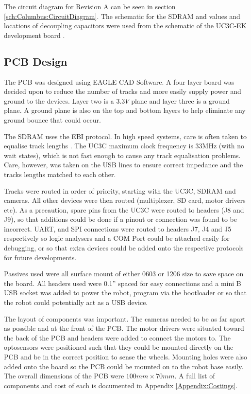 The circuit diagram for Revision A can be seen in section \ref{sch:Columbus:CircuitDiagram}. The schematic for the SDRAM and values and locations of decoupling capacitors were used from the schematic of the UC3C-EK development board \citep{Atmel:UC3CEK}. 
\subsection{PCB Design}
The PCB was designed using EAGLE CAD Software. A four layer board was decided upon to reduce the number of tracks and more easily supply power and ground to the devices. Layer two is a $3.3V$ plane and layer three is a ground plane. A ground plane is also on the top and bottom layers to help eliminate any ground bounce that could occur. 

The SDRAM uses the EBI protocol. In high speed systems, care is often taken to equalise track lengths \citep{liu2004equalization}. The UC3C maximum clock frequency is 33MHz (with no wait states), which is not fast enough to cause any track equalisation problems. Care, however, was taken on the USB lines to ensure correct impedance and the tracks lengths matched to each other.

Tracks were routed in order of priority, starting with the UC3C, SDRAM and cameras. All other devices were then routed (\itc multiplexer, SD card, motor drivers etc). As a precaution, spare pins from the UC3C were routed to headers (J8 and J9), so that additions could be done if a pinout or connection was found to be incorrect. UART, \itc and SPI connections were routed to headers J7, J4 and J5 respectively so logic analysers and a COM Port could be attached easily for debugging, or so that extra devices could be added onto the respective protocols for future developments. 

Passives used were all surface mount of either 0603 or 1206 size to save space on the board. All headers used were 0.1'' spaced for easy connections and a mini B USB socket was added to power the robot, program via the bootloader or so that the robot could potentially act as a USB device. 

The layout of components was important. The cameras needed to be as far apart as possible and at the front of the PCB. The motor drivers were situated toward the back of the PCB and headers were added to connect the motors to. The optosensors were positioned such that they could be mounted directly on the PCB and be in the correct position to sense the wheels. Mounting holes were also added onto the board so the PCB could be mounted on to the robot base easily. The overall dimensions of the PCB were $100mm \times 70mm$. A full list of components and cost of each is documented in Appendix \ref{Appendix:Costings}.

